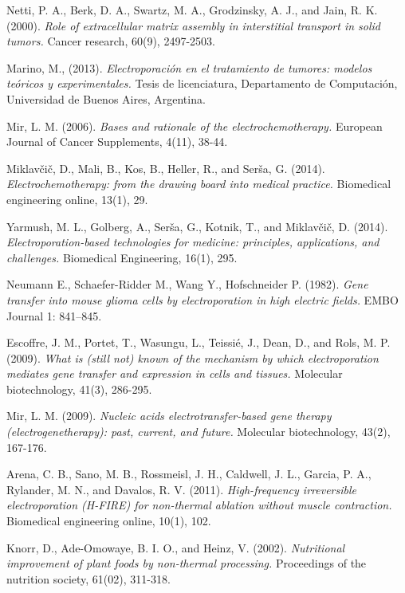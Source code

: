 \backmatter


\begin{thebibliography}{99}
	
	Netti, P. A., Berk, D. A., Swartz, M. A., Grodzinsky, A. J., and Jain, R. K. (2000). \emph{Role of extracellular matrix assembly in interstitial transport in solid tumors.} Cancer research, 60(9), 2497-2503.

	Marino, M., (2013). \emph{Electroporación en el tratamiento de tumores: modelos teóricos y experimentales.} Tesis de licenciatura, Departamento de Computación, Universidad de Buenos Aires, Argentina.

	Mir, L. M. (2006). \emph{Bases and rationale of the electrochemotherapy.} European Journal of Cancer Supplements, 4(11), 38-44.
	
	Miklavčič, D., Mali, B., Kos, B., Heller, R., and Serša, G. (2014). \emph{Electrochemotherapy: from the drawing board into medical practice.} Biomedical engineering online, 13(1), 29.

	Yarmush, M. L., Golberg, A., Serša, G., Kotnik, T., and Miklavčič, D. (2014). \emph{Electroporation-based technologies for medicine: principles, applications, and challenges.} Biomedical Engineering, 16(1), 295.
	
	Neumann E., Schaefer-Ridder M., Wang Y., Hofschneider P. (1982). \emph{Gene transfer into mouse glioma cells by electroporation in high electric fields.} EMBO Journal 1: 841–845.
	
	Escoffre, J. M., Portet, T., Wasungu, L., Teissié, J., Dean, D., and Rols, M. P. (2009). \emph{What is (still not) known of the mechanism by which electroporation mediates gene transfer and expression in cells and tissues.} Molecular biotechnology, 41(3), 286-295.
	
	Mir, L. M. (2009). \emph{Nucleic acids electrotransfer-based gene therapy (electrogenetherapy): past, current, and future.} Molecular biotechnology, 43(2), 167-176.
	
	Arena, C. B., Sano, M. B., Rossmeisl, J. H., Caldwell, J. L., Garcia, P. A., Rylander, M. N., and Davalos, R. V. (2011). \emph{High-frequency irreversible electroporation (H-FIRE) for non-thermal ablation without muscle contraction.} Biomedical engineering online, 10(1), 102.

	Knorr, D., Ade-Omowaye, B. I. O., and Heinz, V. (2002). \emph{Nutritional improvement of plant foods by non-thermal processing.} Proceedings of the nutrition society, 61(02), 311-318.
	

\end{thebibliography}
